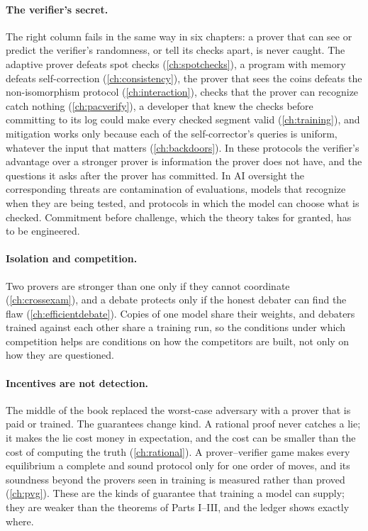 \begin{refsection}
\paragraph{The verifier's secret.} The right column fails in the same way in six chapters: a prover that can see or predict the verifier's randomness, or tell its checks apart, is never caught. The adaptive prover defeats spot checks (\cref{ch:spotchecks}), a program with memory defeats self-correction (\cref{ch:consistency}), the prover that sees the coins defeats the non-isomorphism protocol (\cref{ch:interaction}), checks that the prover can recognize catch nothing (\cref{ch:pacverify}), a developer that knew the checks before committing to its log could make every checked segment valid (\cref{ch:training}), and mitigation works only because each of the self-corrector's queries is uniform, whatever the input that matters (\cref{ch:backdoors}). In these protocols the verifier's advantage over a stronger prover is information the prover does not have, and the questions it asks after the prover has committed. In AI oversight the corresponding threats are contamination of evaluations, models that recognize when they are being tested, and protocols in which the model can choose what is checked. Commitment before challenge, which the theory takes for granted, has to be engineered.

\paragraph{Isolation and competition.} Two provers are stronger than one only if they cannot coordinate (\cref{ch:crossexam}), and a debate protects only if the honest debater can find the flaw (\cref{ch:efficientdebate}). Copies of one model share their weights, and debaters trained against each other share a training run, so the conditions under which competition helps are conditions on how the competitors are built, not only on how they are questioned.

\paragraph{Incentives are not detection.} The middle of the book replaced the worst-case adversary with a prover that is paid or trained. The guarantees change kind. A rational proof never catches a lie; it makes the lie cost money in expectation, and the cost can be smaller than the cost of computing the truth (\cref{ch:rational}). A prover--verifier game makes every equilibrium a complete and sound protocol only for one order of moves, and its soundness beyond the provers seen in training is measured rather than proved (\cref{ch:pvg}). These are the kinds of guarantee that training a model can supply; they are weaker than the theorems of Parts I--III, and the ledger shows exactly where.


\end{refsection}
